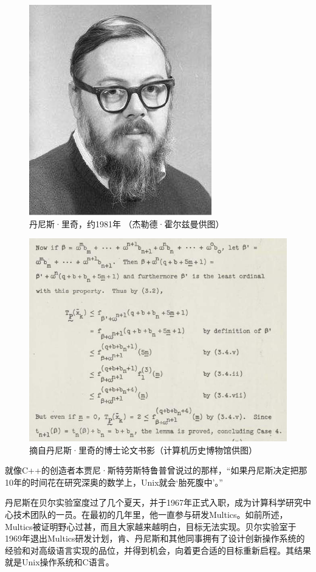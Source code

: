 \documentclass[a4paper,12pt,UTF8,twoside]{ctexbook}
\begin{document}
\begin{figure}[htbp]
	\centering
	\includegraphics[width=0.7\linewidth]{31}
	\caption{丹尼斯·里奇，约1981年 （杰勒德·霍尔兹曼供图）}
	\label{fig:1}
\end{figure}

\begin{figure}[htbp]
	\centering
	\includegraphics[width=0.7\linewidth]{32}
	\caption{摘自丹尼斯·里奇的博士论文书影（计算机历史博物馆供图）}
	\label{fig:1}
\end{figure}

就像C++的创造者本贾尼·斯特劳斯特鲁普曾说过的那样，“如果丹尼斯决定把那10年的时间花在研究深奥的数学上，Unix就会‘胎死腹中’。”

丹尼斯在贝尔实验室度过了几个夏天，并于1967年正式入职，成为计算科学研究中心技术团队的一员。在最初的几年里，他一直参与研发Multics。如前所述，Multics被证明野心过甚，而且大家越来越明白，目标无法实现。贝尔实验室于1969年退出Multics研发计划，肯、丹尼斯和其他同事拥有了设计创新操作系统的经验和对高级语言实现的品位，并得到机会，向着更合适的目标重新启程。其结果就是Unix操作系统和C语言。
\end{document}
